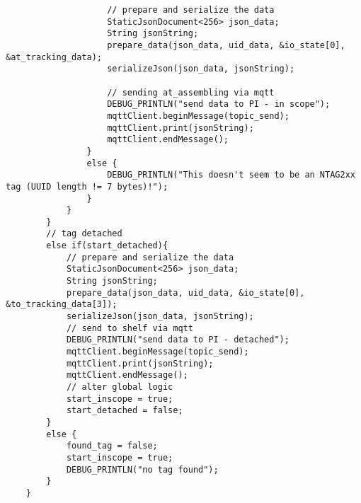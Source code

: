 \begin{lstlisting}
					// prepare and serialize the data
					StaticJsonDocument<256> json_data;
					String jsonString;
					prepare_data(json_data, uid_data, &io_state[0], &at_tracking_data);
					serializeJson(json_data, jsonString);
					
					// sending at_assembling via mqtt
					DEBUG_PRINTLN("send data to PI - in scope");
					mqttClient.beginMessage(topic_send);
					mqttClient.print(jsonString);
					mqttClient.endMessage();
				}
				else {
					DEBUG_PRINTLN("This doesn't seem to be an NTAG2xx tag (UUID length != 7 bytes)!");
				}
			}
		}
		// tag detached
		else if(start_detached){
			// prepare and serialize the data
			StaticJsonDocument<256> json_data;
			String jsonString;
			prepare_data(json_data, uid_data, &io_state[0], &to_tracking_data[3]);
			serializeJson(json_data, jsonString);
			// send to shelf via mqtt
			DEBUG_PRINTLN("send data to PI - detached");
			mqttClient.beginMessage(topic_send);
			mqttClient.print(jsonString);
			mqttClient.endMessage();
			// alter global logic
			start_inscope = true;
			start_detached = false;
		}
		else {
			found_tag = false;
			start_inscope = true;
			DEBUG_PRINTLN("no tag found");
		}
	}
\end{lstlisting}
